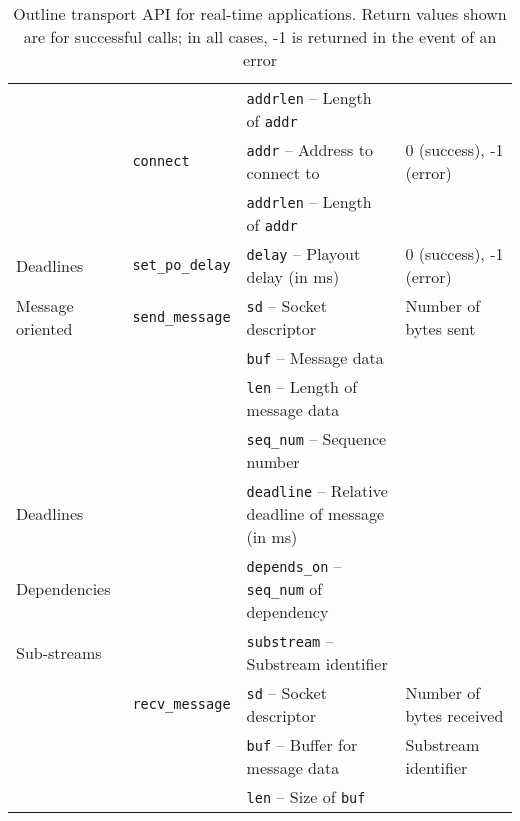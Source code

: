 \documentclass{sig-alternate-05-2015}
\begin{document}
\begin{table*}[t]
\begin{tabularx}{\textwidth}{llll}
                                   &          & \texttt{addrlen} -- Length of \texttt{addr} & \\
                                   & \texttt{connect}
                                              & \texttt{addr} -- Address to connect to         & 0 (success), -1 (error) \\
                                   &          & \texttt{addrlen} -- Length of \texttt{addr} & \\
    \midrule
      Deadlines                    & \texttt{set\_po\_delay}
                                              & \texttt{delay} -- Playout delay (in ms)        & 0 (success), -1 (error) \\
    \midrule
      Message oriented             & \texttt{send\_message}
                                              & \texttt{sd} -- Socket descriptor               & Number of bytes sent \\
                                   &          & \texttt{buf} -- Message data & \\
                                   &          & \texttt{len} -- Length of message data & \\
                                   &          & \texttt{seq\_num} -- Sequence number & \\
      Deadlines                    &          & \texttt{deadline} -- Relative deadline of message (in ms) & \\
      Dependencies                 &          & \texttt{depends\_on} -- \texttt{seq\_num} of dependency & \\
      Sub-streams                  &          & \texttt{substream} -- Substream identifier & \\
                                   & \texttt{recv\_message}
                                              & \texttt{sd} -- Socket descriptor               & Number of bytes received \\
                                   &          & \texttt{buf} -- Buffer for message data        & Substream identifier \\
                                   &          & \texttt{len} -- Size of \texttt{buf} & \\
    \bottomrule
  \end{tabularx}
  \caption{Outline transport API for real-time applications. Return values
  shown are for successful calls; in all cases, -1 is returned in the event
  of an error}
  \label{tab:api}
\end{table*}
\end{document}
